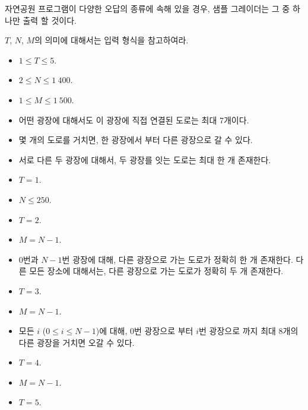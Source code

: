 \begin{problem}{자연공원}
	프로그램이 다양한 오답의 종류에 속해 있을 경우, 샘플 그레이더는 그 중 하나만 출력 할 것이다.
	
	\Constraints
	
	$T$, $N$, $M$의 의미에 대해서는 입력 형식을 참고하여라.
	
	\begin{itemize}
		\item $1 \le T \le 5$.
		\item $2 \le N \le 1\ 400$.
		\item $1 \le M \le 1\ 500$.
		\item 어떤 광장에 대해서도 이 광장에 직접 연결된 도로는 최대 7개이다.
		\item 몇 개의 도로를 거치면, 한 광장에서 부터 다른 광장으로 갈 수 있다.
		\item 서로 다른 두 광장에 대해서, 두 광장를 잇는 도로는 최대 한 개 존재한다.
	\end{itemize}
	
	

	\begin{itemize}
		\item $T = 1$.
		\item $N \le 250$.
	\end{itemize}
	
	\begin{itemize}
		\item $T = 2$.
		\item $M = N-1$.
		\item 0번과 $N-1$번 광장에 대해, 다른 광장으로 가는 도로가 정확히 한 개 존재한다. 다른 모든 장소에 대해서는, 다른 광장으로 가는 도로가 정확히 두 개 존재한다.
	\end{itemize}
	
	\begin{itemize}
		\item $T = 3$.
		\item $M = N-1$.
		\item 모든 $i$ ($0 \le i \le N-1$)에 대해, 0번 광장으로 부터 $i$번 광장으로 까지 최대 8개의 다른 광장을 거치면 오갈 수 있다.
	\end{itemize}
	
	
	\begin{itemize}
		\item $T = 4$.
		\item $M = N-1$.
	\end{itemize}
	
	
	\begin{itemize}
		\item $T = 5$.
	\end{itemize}
	

\end{problem}
